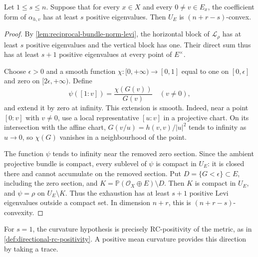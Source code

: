 \begin{theorem}\label{thm:bundle-curvature-complement-convexity}
Let $1\leq s\leq n$. Suppose that for every $x\in X$ and every $0\ne v\in E_x$, the coefficient form of $\alpha_{h,v}$ has at least $s$ positive eigenvalues. Then $U_E$ is $(n+r-s)$-convex.
\end{theorem}
\begin{proof}
By \cref{lem:reciprocal-bundle-norm-levi}, the horizontal block of $\mathcal L_\rho$ has at least $s$ positive eigenvalues and the vertical block has one. Their direct sum thus has at least $s+1$ positive eigenvalues at every point of $E^\times$.

Choose $\epsilon>0$ and a smooth function $\chi:[0,+\infty)\to[0,1]$ equal to one on $[0,\epsilon]$ and zero on $[2\epsilon,+\infty)$. Define
\[
 \psi([1:v])=\frac{\chi(G(v))}{G(v)}\quad(v\ne0),
\]
and extend it by zero at infinity. This extension is smooth. Indeed, near a point $[0:v]$ with $v\ne0$, use a local representative $[u:v]$ in a projective chart. On its intersection with the affine chart, $G(v/u)=h(v,v)/|u|^2$ tends to infinity as $u\to0$, so $\chi(G)$ vanishes in a neighbourhood of the point.

The function $\psi$ tends to infinity near the removed zero section. Since the ambient projective bundle is compact, every sublevel of $\psi$ is compact in $U_E$: it is closed there and cannot accumulate on the removed section. Put $D=\{G<\epsilon\}\subset E$, including the zero section, and $K=\mathbb P(\mathcal O_X\oplus E)\setminus D$. Then $K$ is compact in $U_E$, and $\psi=\rho$ on $U_E\setminus K$. Thus the exhaustion has at least $s+1$ positive Levi eigenvalues outside a compact set. In dimension $n+r$, this is $(n+r-s)$-convexity.
\end{proof}

For $s=1$, the curvature hypothesis is precisely RC-positivity of the metric, as in \cref{def:directional-rc-positivity}. A positive mean curvature provides this direction by taking a trace.

